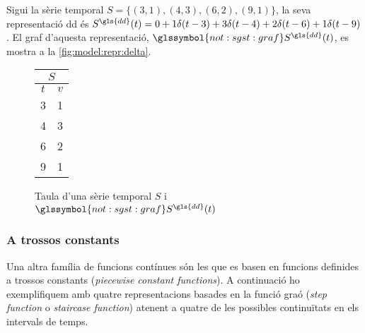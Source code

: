 \begin{example}
  Sigui la sèrie temporal $S=\{ (3,1), (4,3), (6,2), (9,1) \}$, la
  seva representació \gls{dd} és $S^{\gls{dd}}(t) = 0 +1\delta(t-3)
  +3\delta(t-4) +2\delta(t-6) +1\delta(t-9)$. El graf d'aquesta
  representació, $\glssymbol{not:sgst:graf} S^{\gls{dd}}(t)$, es
  mostra a la \autoref{fig:model:repr:delta}.


  \begin{figure}[tp]
  \centering
  \begin{tabular}[c]{|c|c|}
    \multicolumn{2}{c}{$S$} \\ \hline
    $t$  & $v$ \\ \hline
    3  & 1 \\
    4  & 3 \\
    6  & 2 \\
    9  & 1 \\ \hline
  \end{tabular} \qquad
   \caption{Taula d'una sèrie temporal $S$ i
     $\glssymbol{not:sgst:graf} S^{\gls{dd}}(t)$}
  \label{fig:model:repr:delta}
  \end{figure}
\end{example}


\subsubsection{A trossos constants}


Una altra família de funcions contínues són les que es basen en
funcions definides a trossos constants (\emph{piecewise constant
  functions}).  A continuació ho exemplifiquem amb quatre
representacions basades en la funció graó (\emph{step function} o
\emph{staircase function}) atenent a quatre de les possibles
continuïtats en els intervals de temps.


